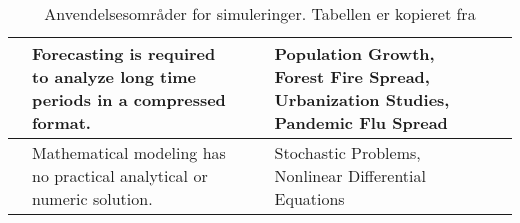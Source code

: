 \begin{table}[ht]
\begin{otherlanguage}{english}
\begin{tabularx}{\textwidth}{|p{15pt}Xp{15pt}|p{15pt}Xp{15pt}|}
  & \vspace{5pt}Forecasting is required to analyze long time periods in a compressed format.\vspace{5pt} & & & \vspace{5pt}Population Growth, Forest Fire Spread, Urbanization Studies, Pandemic Flu Spread \vspace{5pt}&\\
  \hline
  & \vspace{5pt}Mathematical modeling has no practical analytical or numeric solution.\vspace{5pt} & & & \vspace{5pt}Stochastic Problems, Nonlinear Differential Equations\vspace{5pt} & \\
  \hline	
  \end{tabularx}
  \end{otherlanguage}	
  \caption{Anvendelsesområder for simuleringer. Tabellen er kopieret fra \cite[10]{Mchaney2009}}
	\label{tab:simulation_examples}
\end{table}


